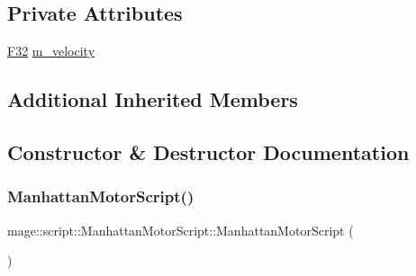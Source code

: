 \subsection*{Private Attributes}
\begin{DoxyCompactItemize}
\item 
\hyperlink{namespacemage_aa97e833b45f06d60a0a9c4fc22ae02c0}{F32} \hyperlink{classmage_1_1script_1_1_manhattan_motor_script_a38cdef10269075f08f3fcdc9ed8bc520}{m\+\_\+velocity}
\end{DoxyCompactItemize}
\subsection*{Additional Inherited Members}


\subsection{Constructor \& Destructor Documentation}
\hypertarget{classmage_1_1script_1_1_manhattan_motor_script_a042ae1a4a53d27c75ff85d5728ac3289}{}\label{classmage_1_1script_1_1_manhattan_motor_script_a042ae1a4a53d27c75ff85d5728ac3289} 
\subsubsection{\texorpdfstring{Manhattan\+Motor\+Script()}{ManhattanMotorScript()}\hspace{0.1cm}{\footnotesize\ttfamily [1/3]}}
{\footnotesize\ttfamily mage\+::script\+::\+Manhattan\+Motor\+Script\+::\+Manhattan\+Motor\+Script (\begin{DoxyParamCaption}{ }\end{DoxyParamCaption})}

\hypertarget{classmage_1_1script_1_1_manhattan_motor_script_a5c3bc9b400243333b661e4fd0e6e74b6}{}\label{classmage_1_1script_1_1_manhattan_motor_script_a5c3bc9b400243333b661e4fd0e6e74b6} 
